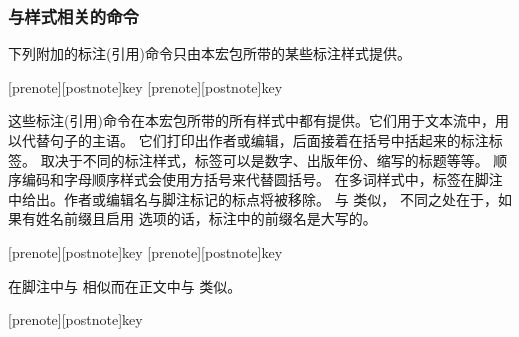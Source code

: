 \subsubsection{与样式相关的命令}%
\label{use:cit:cbx}

下列附加的标注(引用)命令只由本宏包所带的某些标注样式提供。

\begin{ltxsyntax}

[prenote][postnote]{key}
[prenote][postnote]{key}

这些标注(引用)命令在本宏包所带的所有样式中都有提供。它们用于文本流中，用以代替句子的主语。
它们打印出作者或编辑，后面接着在括号中括起来的标注标签。
取决于不同的标注样式，标签可以是数字、出版年份、缩写的标题等等。
顺序编码和字母顺序样式会使用方括号来代替圆括号。
在多词样式中，标签在脚注中给出。作者或编辑名与脚注标记的标点将被移除。
 与  类似，
不同之处在于，如果有姓名前缀且启用  选项的话，标注中的前缀名是大写的。

[prenote][postnote]{key}
[prenote][postnote]{key}

在脚注中与  相似而在正文中与  类似。

[prenote][postnote]{key}


\end{ltxsyntax}
